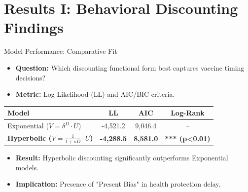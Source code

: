 \documentclass[10pt]{beamer}
\begin{document}
\section{Results I: Behavioral Discounting Findings}

\begin{frame}{Model Performance: Comparative Fit}
    \begin{itemize}
        \item \textbf{Question:} Which discounting functional form best captures vaccine timing decisions?
        \item \textbf{Metric:} Log-Likelihood (LL) and AIC/BIC criteria.
    \end{itemize}
    \begin{table}[]
        \centering
        \begin{tabular}{lccc}
            \hline
            \textbf{Model} & \textbf{LL} & \textbf{AIC} & \textbf{Log-Rank} \\ \hline
            Exponential ($V = \delta^D \cdot U$) & -4,521.2 & 9,046.4 & -- \\
            \textbf{Hyperbolic ($V = \frac{1}{1+\kappa D} \cdot U$)} & \textbf{-4,288.5} & \textbf{8,581.0} & \textbf{*** (p<0.01)} \\ \hline
        \end{tabular}
    \end{table}
    \begin{itemize}
        \item \textbf{Result:} Hyperbolic discounting significantly outperforms Exponential models.
        \item \textbf{Implication:} Presence of "Present Bias" in health protection delay.
    \end{itemize}
\end{frame}
\end{document}
